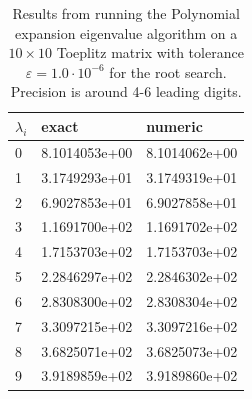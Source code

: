\documentclass[]{article}
\begin{document}
\begin{table}[ht]
	\caption{Results from running the Polynomial expansion eigenvalue algorithm on a $10 \times 10$ Toeplitz matrix with tolerance $\varepsilon = 1.0 \cdot 10^{-6}$ for the root search. Precision is around 4-6 leading digits.}
	\label{tab:poly_toeplitz_methods}
	\begin{center}
		\begin{tabular}{lll}
			\toprule
			$\lambda_i$ &              exact &            numeric \\
			\midrule
				0 & 8.1014053e+00 & 8.1014062e+00 \\
				1 & 3.1749293e+01 & 3.1749319e+01 \\
				2 & 6.9027853e+01 & 6.9027858e+01 \\
				3 & 1.1691700e+02 & 1.1691702e+02 \\
				4 & 1.7153703e+02 & 1.7153703e+02 \\
				5 & 2.2846297e+02 & 2.2846302e+02 \\
				6 & 2.8308300e+02 & 2.8308304e+02 \\
				7 & 3.3097215e+02 & 3.3097216e+02 \\
				8 & 3.6825071e+02 & 3.6825073e+02 \\
				9 & 3.9189859e+02 & 3.9189860e+02 \\
			\bottomrule
		\end{tabular}
	\end{center}
\end{table}
\end{document}
